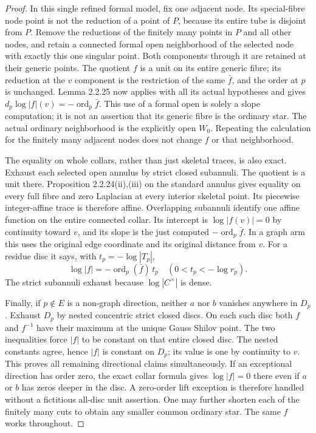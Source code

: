 \documentclass[11pt]{article}
\newcommand{\ord}{\operatorname{ord}}
\begin{document}
\begin{proof}
In this single refined formal model, fix one adjacent node. Its
special-fibre node point is not the reduction of a point of $P$,
because its entire tube is disjoint from $P$. Remove the reductions
of the finitely many points in $P$ and all other nodes, and retain
a connected formal open neighborhood of the selected node with
exactly this one singular point. Both components through it are
retained at their generic points. The quotient $f$ is a unit on
its entire generic fibre; its reduction at the $v$ component is
the restriction of the same $\bar f$, and the order at $p$ is
unchanged. Lemma 2.2.25 now applies with all its actual hypotheses
and gives $d_p\log|f|(v)=-\ord_p\bar f$.
This use of a formal open is solely a slope computation; it is
not an assertion that its generic fibre is the ordinary star.
The actual ordinary neighborhood is the explicitly open $W_0$.
Repeating the calculation for the finitely many adjacent nodes
does not change $f$ or that neighborhood.

The equality on whole collars, rather than just skeletal traces,
is also exact. Exhaust each selected open annulus by strict closed
subannuli. The quotient is a unit there. Proposition 2.2.24(ii),(iii)
on the standard annulus gives equality on every full fibre and
zero Laplacian at every interior skeletal point. Its piecewise
integer-affine trace is therefore affine. Overlapping subannuli
identify one affine function on the entire connected collar. Its
intercept is $\log|f(v)|=0$ by continuity toward $v$, and its slope
is the just computed $-\ord_p\bar f$. In a graph arm this uses
the original edge coordinate and its original distance from $v$.
For a residue disc it says, with $t_p=-\log|T_p|$,
\[
                    \log|f|=-\ord_p(\bar f)\,t_p
                   \quad (0<t_p<-\log r_p).
\]
The strict subannuli exhaust because $\log|C^\times|$ is dense.

Finally, if $p\notin E$ is a non-graph direction, neither $a$ nor
$b$ vanishes anywhere in $D_p$. Exhaust $D_p$ by nested concentric
strict closed discs. On each such disc both $f$ and $f^{-1}$ have
their maximum at the unique Gauss Shilov point. The two inequalities
force $|f|$ to be constant on that entire closed disc. The nested
constants agree, hence $|f|$ is constant on $D_p$; its value is
one by continuity to $v$. This proves all remaining directional
claims simultaneously. If an exceptional direction has order zero,
the exact collar formula gives $\log|f|=0$ there even if $a$ or
$b$ has zeros deeper in the disc. A zero-order lift exception is
therefore handled without a fictitious all-disc unit assertion.
One may further shorten each of the finitely many cuts to obtain
any smaller common ordinary star. The same $f$ works throughout.
\end{proof}
\end{document}
